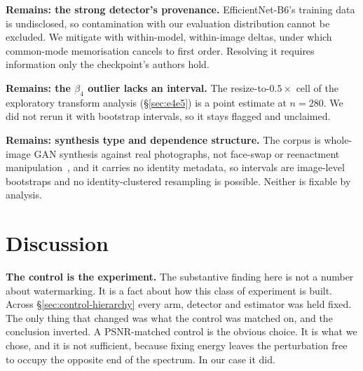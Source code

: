 \documentclass[journal]{IEEEtran}
\begin{document}
\textbf{Remains: the strong detector's provenance.} EfficientNet-B6's training
data is undisclosed, so contamination with our evaluation distribution cannot
be excluded. We mitigate with within-model, within-image deltas, under which
common-mode memorisation cancels to first order. Resolving it requires
information only the checkpoint's authors hold.

\textbf{Remains: the $\beta_4$ outlier lacks an interval.} The
resize-to-$0.5\times$ cell of the exploratory transform analysis
(\S\ref{sec:e4e5}) is a point estimate at $n{=}280$. We did not rerun it with
bootstrap intervals, so it stays flagged and unclaimed.

\textbf{Remains: synthesis type and dependence structure.} The corpus is
whole-image GAN synthesis against real photographs, not face-swap or
reenactment manipulation~\cite{rossler2019faceforensics}, and it carries no
identity metadata, so intervals are image-level bootstraps and no
identity-clustered resampling is possible. Neither is fixable by analysis.

\section{Discussion}

\textbf{The control is the experiment.} The substantive finding here is not a
number about watermarking. It is a fact about how this class of experiment is
built. Across \S\ref{sec:control-hierarchy} every arm, detector and estimator
was held fixed. The only thing that changed was what the control was matched
on, and the conclusion inverted. A PSNR-matched control is the obvious choice.
It is what we chose, and it is not sufficient, because fixing energy leaves the
perturbation free to occupy the opposite end of the spectrum. In our case it
did.
\end{document}
